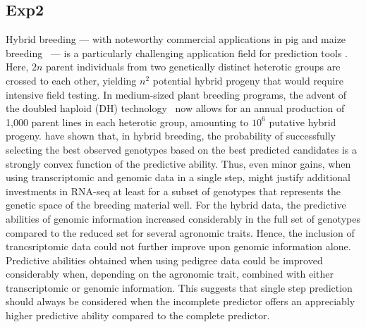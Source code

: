 \documentclass[12pt,titlepage]{article}
\begin{document}
\subsection{Exp2}
Hybrid breeding --- with noteworthy commercial applications in pig
\cite{Xiang2016,Tusell2016} and maize breeding~\cite{TheRoyalSociety2009} --- 
is a particularly challenging application field for prediction tools 
\cite{Kadam2016}.
Here, $2n$ parent individuals from two genetically distinct heterotic groups are
crossed to each other, yielding $n^{2}$ potential hybrid progeny that would
require intensive field testing.
In medium-sized plant breeding programs, the advent of the doubled haploid (DH) 
technology~\cite{Wedzony2009} now allows for an annual production of 1,000 
parent lines in each heterotic group, amounting to $10^{6}$ putative hybrid
progeny.
 have shown that, in hybrid breeding, the probability 
of successfully selecting the best observed genotypes based on the best 
predicted candidates is a strongly convex function of the predictive ability.
Thus, even minor gains, when using transcriptomic and genomic data in a
single step, might justify additional investments in RNA-seq at least for a
subset of genotypes that represents the genetic space of the breeding 
material well.
For the hybrid data, the predictive abilities of genomic information
increased considerably in the full set of genotypes compared to the reduced
set for several agronomic traits.
Hence, the inclusion of trancsriptomic data could not further improve upon
genomic information alone.
Predictive abilities obtained when using pedigree data could be 
improved considerably when, depending on the agronomic trait, combined with 
either transcriptomic or genomic information.
This suggests that single step prediction should always be considered when the
incomplete predictor offers an appreciably higher predictive ability compared
to the complete predictor.
\end{document}
